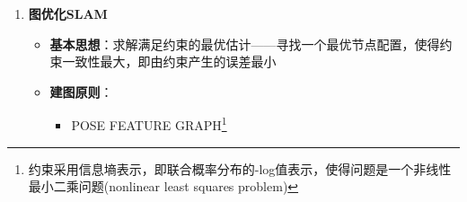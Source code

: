 \documentclass[../main.tex]{subfiles}
\begin{document}
\begin{enumerate}
\begin{itemize}
\begin{align}
            &= \dfrac{p\big(\mathbf{x}_t^{[k]}\mid \mathbf{Z}^t,\mathbf{U}^{t-1}\big)}
                     {p\big(\mathbf{x}_t^{[k]}\mid \mathbf{Z}^{t-1},\mathbf{U}^{t-1}\big)} \\[6pt]
            &= \eta\,\dfrac{p\big(\mathbf{z}_t\mid \mathbf{x}_t^{[k]},\mathbf{Z}^{t-1},\mathbf{U}^{t-1}\big)\,
                        p\big(\mathbf{x}_t^{[k]}\mid \mathbf{Z}^{t-1},\mathbf{U}^{t-1}\big)}
                       {p\big(\mathbf{x}_t^{[k]}\mid \mathbf{Z}^{t-1},\mathbf{U}^{t-1}\big)} \\[6pt]
            &= \eta\, p\big(\mathbf{z}_t\mid \mathbf{x}_t^{[k]},\mathbf{Z}^{t-1}\big) \\[6pt]
            &= \eta \int p\big(\mathbf{z}_t\mid \mathbf{m}_i,\mathbf{x}_t^{[k]},\mathbf{Z}^{t-1}\big)\,
                        p\big(\mathbf{m}_i\mid \mathbf{x}_t^{[k]},\mathbf{Z}^{t-1}\big)\,\mathrm{d}\mathbf{m}_i \\[6pt]
            &= \eta \int p\big(\mathbf{z}_t\mid \mathbf{m}_i,\mathbf{x}_t^{[k]}\big)\,
                        p\big(\mathbf{m}_i\mid \mathbf{x}_t^{[k]},\mathbf{Z}^{t-1}\big)\,\mathrm{d}\mathbf{m}_i
            \end{align}
            \item \textbf{优点}：
            \begin{itemize}
                \item 即可用于特征地图，也可用于栅格地图
                \item 结合观测优化建议有助于精确粒子估计，减少所需要的粒子数
            \end{itemize}
            \item \textbf{问题}：每个粒子维持一张栅格地图，过于耗费存储资源，需要尽量减少粒子数但又要避免粒子枯竭\footnote{尽管我们已经在上面的推导中分解先估计机器人位姿，在位姿条件下再去估计地图，减少了粒子数的需求，但仍然很耗资源}
        \end{itemize}
        \item \textbf{图优化SLAM}
        \begin{itemize}
            \item \textbf{基本思想}：求解满足约束的最优估计——寻找一个最优节点配置，使得约束一致性最大，即由约束产生的误差最小
            \item \textbf{建图原则}：
            \begin{itemize}
                \item POSE FEATURE GRAPH\footnote{约束采用信息墒表示，即联合概率分布的-log值表示，使得问题是一个非线性最小二乘问题(nonlinear least squares problem)}

\end{itemize}
\end{itemize}
\end{enumerate}
\end{document}
